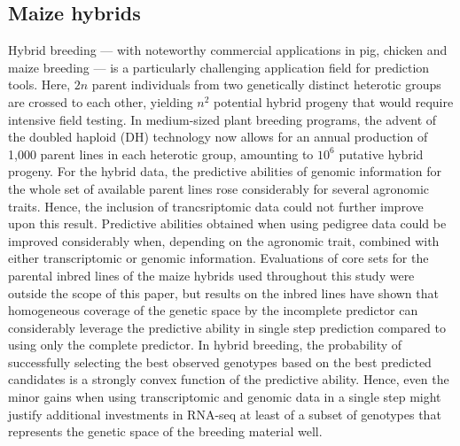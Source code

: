 \documentclass[12pt,titlepage]{article}
\begin{document}
\subsection{Maize hybrids}
Hybrid breeding --- with noteworthy commercial applications in pig, chicken and 
maize breeding --- is a particularly challenging application field for
prediction tools.
Here, $2n$ parent individuals from two genetically distinct heterotic groups are
crossed to each other, yielding $n^{2}$ potential hybrid progeny that would
require intensive field testing.
In medium-sized plant breeding programs, the advent of the doubled haploid (DH) 
technology \cite{Wedzony2009} now allows for an annual production of 1,000 
parent lines in each heterotic group, amounting to $10^{6}$ putative hybrid
progeny.
For the hybrid data, the predictive abilities of genomic information
for the whole set of available parent lines rose considerably for several
agronomic traits.
Hence, the inclusion of trancsriptomic data could not further improve upon
this result.
Predictive abilities obtained when using pedigree data could be 
improved considerably when, depending on the agronomic trait, combined with 
either transcriptomic or genomic information.
Evaluations of core sets for the parental inbred lines of the maize hybrids
used throughout this study were outside the scope of this paper, but
results on the inbred lines have shown that homogeneous coverage of the
genetic space by the incomplete predictor can considerably leverage the
predictive ability in single step prediction compared to using only the
complete predictor.
In hybrid breeding, the probability of successfully selecting the best
observed genotypes based on the best predicted candidates is a strongly 
convex function of the predictive ability.
Hence, even the minor gains when using transcriptomic and genomic data in a
single step might justify additional investments in RNA-seq at least of a
subset of genotypes that represents the genetic space of the breeding 
material well.
\end{document}
